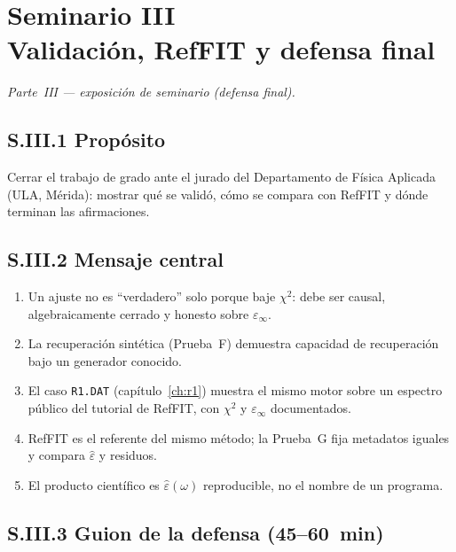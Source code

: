 \chapter*{Seminario III\\Validaci\'on, RefFIT y defensa final}
\label{sem:3}

\noindent\textit{Parte~III --- exposici\'on de seminario (defensa final).}

\section*{S.III.1 Prop\'osito}

Cerrar el trabajo de grado ante el jurado del Departamento de F\'isica Aplicada (ULA, M\'erida): mostrar qu\'e se valid\'o, c\'omo se compara con RefFIT y d\'onde terminan las afirmaciones.

\section*{S.III.2 Mensaje central}

\begin{enumerate}[leftmargin=*]
\item Un ajuste no es ``verdadero'' solo porque baje $\chi^{2}$: debe ser causal, algebraicamente cerrado y honesto sobre $\varepsilon_\infty$.
\item La recuperaci\'on sint\'etica (Prueba~F) demuestra capacidad de recuperaci\'on bajo un generador conocido.
\item El caso \texttt{R1.DAT} (cap\'itulo~\ref{ch:r1}) muestra el mismo motor sobre un espectro p\'ublico del tutorial de RefFIT, con $\chi^{2}$ y $\varepsilon_\infty$ documentados.
\item RefFIT es el referente del mismo m\'etodo; la Prueba~G fija metadatos iguales y compara $\hat\varepsilon$ y residuos.
\item El producto cient\'ifico es $\hat\varepsilon(\omega)$ reproducible, no el nombre de un programa.
\end{enumerate}

\section*{S.III.3 Guion de la defensa (45--60~min)}

